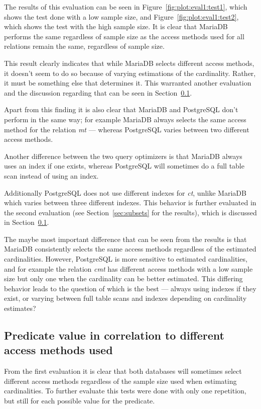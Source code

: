 The results of this evaluation can be seen in Figure~\ref{fig:plot:eval1:test1},
which shows the test done with a low sample size, and
Figure~\ref{fig:plot:eval1:test2}, which shows the test with the high sample size.
It is clear that MariaDB performs the same regardless of sample size as the
access methods used for all relations remain the same, regardless of sample size.

This result clearly indicates that while MariaDB selects different access
methods, it doesn't seem to do so because of varying estimations of the
cardinality. Rather, it must be something else that determines it. This
warranted another evaluation and the discussion regarding that can be seen in
Section~\ref{sec:predicatecorrelation}.

Apart from this finding it is also clear that MariaDB and PostgreSQL don't
perform in the same way; for example MariaDB always selects the same access method for
the relation \textit{mt} --- whereas PostgreSQL varies between two different access
methods.

Another difference between the two query optimizers is that MariaDB always uses an
index if one exists, whereas PostgreSQL will sometimes do a full table scan
instead of using an index.

Additionally PostgreSQL does not use different indexes for \textit{ct}, unlike
MariaDB which varies between three different indexes. This behavior is further
evaluated in the second evaluation (see Section~\ref{sec:subsets} for the
results), which is discussed in Section~\ref{sec:predicatecorrelation}.

The maybe most important difference that can be seen from the results
is that MariaDB consistently selects the same access methods regardless of
the estimated cardinalities. However, PostgreSQL is more sensitive to estimated
cardinalities, and for example the relation \textit{cmt} has different access methods
with a low sample size but only one when the cardinality can be better
estimated. This differing behavior leads to the question of which is the best
--- always using indexes if they exist, or varying between full table scans and
indexes depending on cardinality estimates?

\subsection{Predicate value in correlation to different access methods used}\label{sec:predicatecorrelation}
From the first evaluation it is clear that both databases will sometimes select different
access methods regardless of the sample size used when estimating cardinalities.
To further evaluate this tests were done with only one repetition, but still
for each possible value for the predicate.

